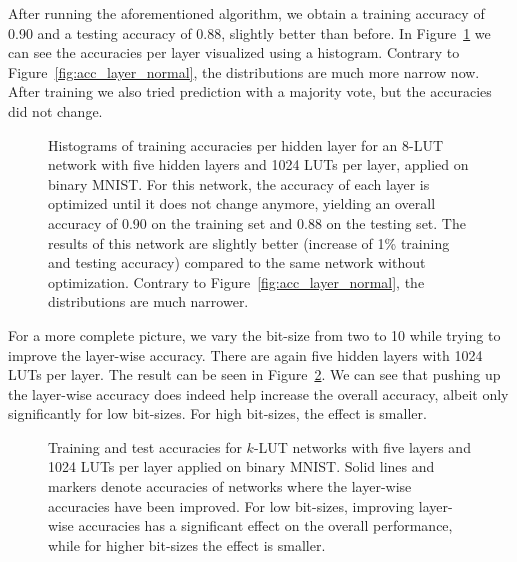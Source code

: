 After running the aforementioned algorithm, we obtain a training accuracy of 0.90 and a testing accuracy of 0.88, slightly better than before. In Figure~\ref{fig:acc_layer_discard} we can see the accuracies per layer visualized using a histogram. Contrary to Figure~\ref{fig:acc_layer_normal}, the distributions are much more narrow now. After training we also tried prediction with a majority vote, but the accuracies did not change.

\begin{figure}[!htb]
    \centering
    
    \caption{Histograms of training accuracies per hidden layer for an 8-LUT network with five hidden layers and 1024 LUTs per layer, applied on binary MNIST. For this network, the accuracy of each layer is optimized until it does not change anymore, yielding an overall accuracy of 0.90 on the training set and 0.88 on the testing set. The results of this network are slightly better (increase of 1\% training and testing accuracy) compared to the same network without optimization. Contrary to Figure~\ref{fig:acc_layer_normal}, the distributions are much narrower.}
\label{fig:acc_layer_discard}
\end{figure}

\noindent For a more complete picture, we vary the bit-size from two to 10 while trying to improve the layer-wise accuracy. There are again five hidden layers with 1024 LUTs per layer. The result can be seen in Figure~\ref{fig:increase_layer_acc}. We can see that pushing up the layer-wise accuracy does indeed help increase the overall accuracy, albeit only significantly for low bit-sizes. For high bit-sizes, the effect is smaller.


\begin{figure}[!htb]
    \centering
    
    \caption{Training and test accuracies for $k$-LUT networks with five layers and 1024 LUTs per layer applied on binary MNIST. Solid lines and markers denote accuracies of networks where the layer-wise accuracies have been improved. For low bit-sizes, improving layer-wise accuracies has a significant effect on the overall performance, while for higher bit-sizes the effect is smaller.}
\label{fig:increase_layer_acc}
\end{figure}
\FloatBarrier


